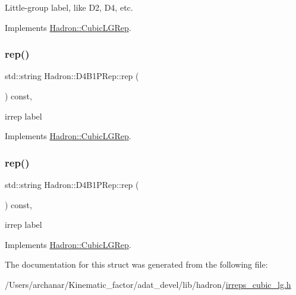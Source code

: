 Little-\/group label, like D2, D4, etc. 

Implements \mbox{\hyperlink{structHadron_1_1CubicLGRep_a9bdb14b519a611d21379ed96a3a9eb41}{Hadron\+::\+Cubic\+L\+G\+Rep}}.

\mbox{\label{structHadron_1_1D4B1PRep_af8dc23f058e45e4ee038bf8e7f2eb5b2}} 
\subsubsection{\texorpdfstring{rep()}{rep()}\hspace{0.1cm}{\footnotesize\ttfamily [1/2]}}
{\footnotesize\ttfamily std\+::string Hadron\+::\+D4\+B1\+P\+Rep\+::rep (\begin{DoxyParamCaption}{ }\end{DoxyParamCaption}) const\hspace{0.3cm}{\ttfamily [inline]}, {\ttfamily [virtual]}}

irrep label 

Implements \mbox{\hyperlink{structHadron_1_1CubicLGRep_a50f5ddbb8f4be4cee0106fa9e8c75e6c}{Hadron\+::\+Cubic\+L\+G\+Rep}}.

\mbox{\label{structHadron_1_1D4B1PRep_af8dc23f058e45e4ee038bf8e7f2eb5b2}} 
\subsubsection{\texorpdfstring{rep()}{rep()}\hspace{0.1cm}{\footnotesize\ttfamily [2/2]}}
{\footnotesize\ttfamily std\+::string Hadron\+::\+D4\+B1\+P\+Rep\+::rep (\begin{DoxyParamCaption}{ }\end{DoxyParamCaption}) const\hspace{0.3cm}{\ttfamily [inline]}, {\ttfamily [virtual]}}

irrep label 

Implements \mbox{\hyperlink{structHadron_1_1CubicLGRep_a50f5ddbb8f4be4cee0106fa9e8c75e6c}{Hadron\+::\+Cubic\+L\+G\+Rep}}.



The documentation for this struct was generated from the following file\+:\begin{DoxyCompactItemize}
\item 
/\+Users/archanar/\+Kinematic\+\_\+factor/adat\+\_\+devel/lib/hadron/\mbox{\hyperlink{lib_2hadron_2irreps__cubic__lg_8h}{irreps\+\_\+cubic\+\_\+lg.\+h}}\end{DoxyCompactItemize}
